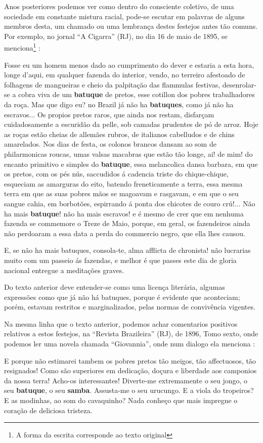 Anos posteriores podemos ver como dentro do consciente coletivo, 
de uma sociedade em constante mistura racial, 
pode-se escutar em palavras de alguns membros desta,
um chamado ou uma lembrança destes festejos antes tão comuns.
Por exemplo, no jornal ``A Cigarra'' (RJ), 
no dia 16 de maio de 1895, se menciona\footnote{\label{footort4}A forma da escrita corresponde ao texto original} \cite[pp. 2]{batuqueperiodicoacigarra}:
\begin{citando}%
Fosse eu um homem menos dado 
ao cumprimento do dever e estaria a 
esta hora, longe d'aqui, em qualquer 
fazenda do interior, vendo, no terreiro 
afestoado de folhagens de mangueiras e
cheio da palpitação das flammulas 
festivas, desenrolar-se a cobra viva de um 
\textbf{batuque} de pretos, esse cotillon dos 
pobres trabalhadores da roça. Mas que digo
eu? no Brazil já não ha \textbf{batuques}, como 
já não ha escravos... Os propios pretos
raros, que ainda nos restam, disfarçam 
cuidadosamente a escuridão da pelle, sob
camadas prudentes de pó de arroz. Hoje 
as roças estão cheias de allemães rubros,
de italianos cabelludos e de chins amarelados.
Nos dias de festa, os colonos brancos
dansam ao som de philarmonicas 
roucas, umas valsas macabras que estão
tão longe, ai! de mim! do encanto primitivo
e simples do \textbf{batuque}, essa melancolica 
dansa barbara, em que os pretos,
com os pés nús, saccudidos á cadencia
triste do chique-chique, esqueciam as 
amarguras do eito, batendo freneticamente a terra,
essa mesma terra em que as suas pobres mãos 
se magoavam e rasgavam, e em que o seu sangue cahia,
em borbotões, espirrando á ponta dos chicotes de couro crú!...
Não ha mais \textbf{batuque}! não ha mais escravos! e é mesmo de
crer que em nenhuma fazenda se commemore o Treze de Maio, 
porque, em geral, os fazendeiros ainda não perdoaram
a essa data a perda do commercio negro, que ella lhes causou.

E, se não ha mais batuques, consola-te, alma afflicta de 
chronista! não lucrarias muito com um passeio ás fazendas,
e melhor é que passes este dia de gloria nacional entregue 
a meditações graves.
\end{citando}
Do texto anterior deve entender-se como uma licença literária, algumas expressões
como que já não há batuques, porque é evidente que aconteciam; porém, 
estavam restritos e marginalizados, pelas normas de convivência vigentes.

Na mesma linha que o texto anterior, 
podemos achar comentarios positivos relativos a estos festejos, na ``Revista Brazileira'' (RJ), 
de 1896, Tomo sexto, onde podemos ler uma novela chamada ``Giovannia'',
onde num dialogo ela menciona \cite[pp. 155]{batuqueperiodicorevistabrasileira}:
\begin{citando}%
E porque não estimarei tambem os pobres pretos tão meigos, tão 
affectuosos, tão resignados! Como são superiores em dedicação, doçura
e liberdade aos camponios da nossa terra! Acho-os interessantes! 
Diverte-me extremamente o seu jongo, o seu \textbf{batuque}, o seu \textbf{samba}.
Assusta-me o seu urucungo. E a viola do tropeiros? E as modinhas, ao 
som do cavaquinho? Nada conheço que mais impregne o coração de
deliciosa tristeza.
\end{citando}


